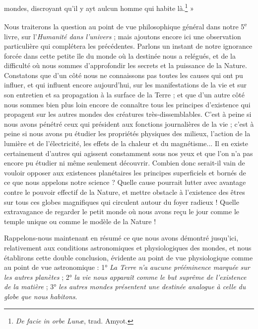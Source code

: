 \documentclass[a4paper, 11pt, oneside, landscape]{article}
\begin{document}
mondes, discroyant qu'il y ayt aulcun homme qui habite là.\footnote{\emph{De facie in orbe Lunæ}, trad. Amyot.} »

Nous traiterons la question au point de vue philosophique général dans notre 5\textsuperscript{e} livre, sur l'\emph{Humanité dans l'univers} ; mais ajoutons encore ici une observation particulière qui complétera les précédentes. Parlons un instant de notre ignorance forcée dans cette petite île du monde où la destinée nous a relégués, et de la difficulté où nous sommes d'approfondir les secrets et la puissance de la Nature. Constatons que d'un côté nous ne connaissons pas toutes les causes qui ont pu influer, et qui influent encore aujourd'hui, sur les manifestations de la vie et sur son entretien et sa propagation à la surface de la Terre ; et que d'un autre côté nous sommes bien plus loin encore de connaître tous les principes d'existence qui propagent sur les autres mondes des créatures très-dissemblables. C'est à peine si nous avons pénétré ceux qui président aux fonctions journalières de la vie ; c'est à peine si nous avons pu étudier les propriétés physiques des milieux, l'action de la lumière et de l'électricité, les effets de la chaleur et du magnétisme... Il en existe certainement d'autres qui agissent constamment sous nos yeux et que l'on n'a pas encore pu étudier ni même seulement découvrir. Combien donc serait-il vain de vouloir opposer aux existences planétaires les principes superficiels et bornés de ce que nous appelons notre science ? Quelle cause pourrait lutter avec avantage contre le pouvoir effectif de la Nature, et mettre obstacle à l'existence des êtres sur tous ces globes magnifiques qui circulent autour du foyer radieux ! Quelle extravagance de regarder le petit monde où nous avons reçu le jour comme le temple unique ou comme le modèle de la Nature !

Rappelons-nous maintenant en résumé ce que nous avons démontré jusqu'ici, relativement aux conditions astronomiques et physiologiques des mondes, et nous établirons cette double conclusion, évidente au point de vue physiologique comme au point de vue astronomique : 1° \emph{La Terre n'a aucune prééminence marquée sur les autres planètes} ; 2° \emph{la vie nous apparaît comme le but suprême de l'existence de la matière} ; 3° \emph{les autres mondes présentent une destinée analogue à celle du globe que nous habitons}.
\end{document}
